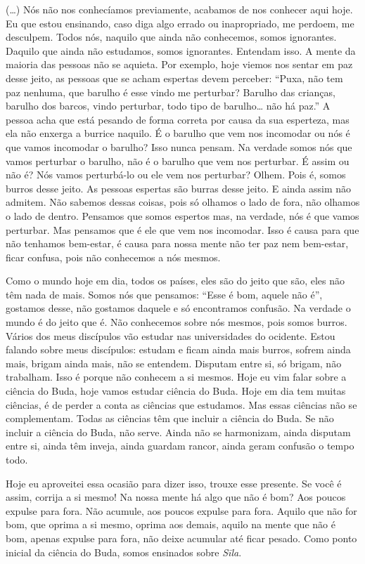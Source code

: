 (…) Nós não nos conhecíamos previamente, acabamos de nos conhecer
aqui hoje. Eu que estou ensinando, caso diga algo errado ou
inapropriado, me perdoem, me desculpem. Todos nós, naquilo que ainda
não conhecemos, somos ignorantes. Daquilo que ainda não estudamos,
somos ignorantes. Entendam isso. A mente da maioria das pessoas não se
aquieta. Por exemplo, hoje viemos nos sentar em paz desse jeito, as
pessoas que se acham espertas devem perceber: “Puxa, não tem paz
nenhuma, que barulho é esse vindo me perturbar? Barulho das crianças,
barulho dos barcos, vindo perturbar, todo tipo de barulho… não há paz.”
A pessoa acha que está pesando de forma correta por causa da sua
esperteza, mas ela não enxerga a burrice naquilo. É o barulho que vem
nos incomodar ou nós é que vamos incomodar o barulho? Isso nunca
pensam. Na verdade somos nós que vamos perturbar o barulho, não é o
barulho que vem nos perturbar. É assim ou não é? Nós vamos perturbá-lo
ou ele vem nos perturbar? Olhem. Pois é, somos burros desse jeito. As
pessoas espertas são burras desse jeito. E ainda assim não admitem. Não
sabemos dessas coisas, pois só olhamos o lado de fora, não olhamos o
lado de dentro. Pensamos que somos espertos mas, na verdade, nós é que
vamos perturbar. Mas pensamos que é ele que vem nos incomodar. Isso é
causa para que não tenhamos bem-estar, é causa para nossa mente não ter
paz nem bem-estar, ficar confusa, pois não conhecemos a nós mesmos.

Como o mundo hoje em dia, todos os países, eles são do jeito que
são, eles não têm nada de mais. Somos nós que pensamos: “Esse é bom,
aquele não é”, gostamos desse, não gostamos daquele e só encontramos
confusão. Na verdade o mundo é do jeito que é. Não conhecemos sobre nós
mesmos, pois somos burros. Vários dos meus discípulos vão estudar nas
universidades do ocidente. Estou falando sobre meus discípulos: estudam
e ficam ainda mais burros, sofrem ainda mais, brigam ainda mais, não se
entendem. Disputam entre si, só brigam, não trabalham. Isso é porque
não conhecem a si mesmos. Hoje eu vim falar sobre a ciência do Buda,
hoje vamos estudar ciência do Buda. Hoje em dia tem muitas ciências, é
de perder a conta as ciências que estudamos. Mas essas ciências não se
complementam. Todas as ciências têm que incluir a ciência do Buda. Se
não incluir a ciência do Buda, não serve. Ainda não se harmonizam,
ainda disputam entre si, ainda têm inveja, ainda guardam rancor, ainda
geram confusão o tempo todo.

Hoje eu aproveitei essa ocasião para dizer isso, trouxe esse
presente. Se você é assim, corrija a si mesmo! Na nossa mente há algo
que não é bom? Aos poucos expulse para fora. Não acumule, aos poucos
expulse para fora. Aquilo que não for bom, que oprima a si mesmo,
oprima aos demais, aquilo na mente que não é bom, apenas expulse para
fora, não deixe acumular até ficar pesado. Como ponto inicial da
ciência do Buda, somos ensinados sobre \textit{Sīla}. 

